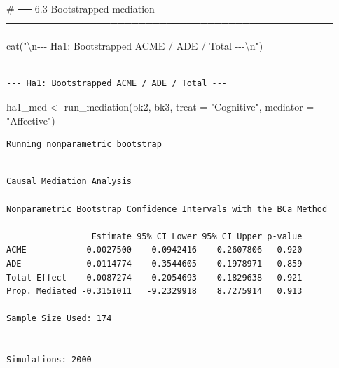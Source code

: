 \documentclass[
  letterpaper,
  DIV=11,
  numbers=noendperiod]{scrartcl}
\newenvironment{Shaded}{\begin{snugshade}}{\end{snugshade}}
\newcommand{\AttributeTok}[1]{\textcolor[rgb]{0.40,0.45,0.13}{#1}}
\newcommand{\CommentTok}[1]{\textcolor[rgb]{0.37,0.37,0.37}{#1}}
\newcommand{\FunctionTok}[1]{\textcolor[rgb]{0.28,0.35,0.67}{#1}}
\newcommand{\NormalTok}[1]{\textcolor[rgb]{0.00,0.23,0.31}{#1}}
\newcommand{\OtherTok}[1]{\textcolor[rgb]{0.00,0.23,0.31}{#1}}
\newcommand{\SpecialCharTok}[1]{\textcolor[rgb]{0.37,0.37,0.37}{#1}}
\newcommand{\StringTok}[1]{\textcolor[rgb]{0.13,0.47,0.30}{#1}}
\begin{document}
\begin{Shaded}
\begin{Highlighting}[]
\CommentTok{\# ── 6.3  Bootstrapped mediation ───────────────────────────────────────────────}

\FunctionTok{cat}\NormalTok{(}\StringTok{"}\SpecialCharTok{\textbackslash{}n}\StringTok{{-}{-}{-} Ha1: Bootstrapped ACME / ADE / Total {-}{-}{-}}\SpecialCharTok{\textbackslash{}n}\StringTok{"}\NormalTok{)}
\end{Highlighting}
\end{Shaded}

\begin{verbatim}

--- Ha1: Bootstrapped ACME / ADE / Total ---
\end{verbatim}

\begin{Shaded}
\begin{Highlighting}[]
\NormalTok{ha1\_med }\OtherTok{\textless{}{-}} \FunctionTok{run\_mediation}\NormalTok{(bk2, bk3, }\AttributeTok{treat =} \StringTok{"Cognitive"}\NormalTok{, }\AttributeTok{mediator =} \StringTok{"Affective"}\NormalTok{)}
\end{Highlighting}
\end{Shaded}

\begin{verbatim}
Running nonparametric bootstrap
\end{verbatim}

\begin{verbatim}

Causal Mediation Analysis 

Nonparametric Bootstrap Confidence Intervals with the BCa Method

                 Estimate 95% CI Lower 95% CI Upper p-value
ACME            0.0027500   -0.0942416    0.2607806   0.920
ADE            -0.0114774   -0.3544605    0.1978971   0.859
Total Effect   -0.0087274   -0.2054693    0.1829638   0.921
Prop. Mediated -0.3151011   -9.2329918    8.7275914   0.913

Sample Size Used: 174 


Simulations: 2000 
\end{verbatim}
\end{document}

